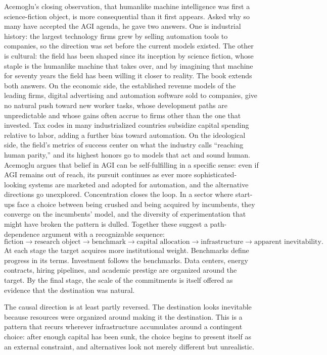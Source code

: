 \documentclass[11pt]{article}
\begin{document}
Acemoglu's closing observation, that humanlike machine intelligence was first a science-fiction object, is more consequential than it first appears. Asked why so many have accepted the AGI agenda, he gave two answers. One is industrial history: the largest technology firms grew by selling automation tools to companies, so the direction was set before the current models existed. The other is cultural: the field has been shaped since its inception by science fiction, whose staple is the humanlike machine that takes over, and by imagining that machine for seventy years the field has been willing it closer to reality. The book extends both answers. On the economic side, the established revenue models of the leading firms, digital advertising and automation software sold to companies, give no natural push toward new worker tasks, whose development paths are unpredictable and whose gains often accrue to firms other than the one that invested. Tax codes in many industrialized countries subsidize capital spending relative to labor, adding a further bias toward automation. On the ideological side, the field's metrics of success center on what the industry calls ``reaching human parity,'' and its highest honors go to models that act and sound human. Acemoglu argues that belief in AGI can be self-fulfilling in a specific sense: even if AGI remains out of reach, its pursuit continues as ever more sophisticated-looking systems are marketed and adopted for automation, and the alternative directions go unexplored. Concentration closes the loop. In a sector where start-ups face a choice between being crushed and being acquired by incumbents, they converge on the incumbents' model, and the diversity of experimentation that might have broken the pattern is dulled. Together these suggest a path-dependence argument with a recognizable sequence:
\[
\text{fiction}
\to \text{research object}
\to \text{benchmark}
\to \text{capital allocation}
\to \text{infrastructure}
\to \text{apparent inevitability}.
\]
At each stage the target acquires more institutional weight. Benchmarks define progress in its terms. Investment follows the benchmarks. Data centers, energy contracts, hiring pipelines, and academic prestige are organized around the target. By the final stage, the scale of the commitments is itself offered as evidence that the destination was natural.

The causal direction is at least partly reversed. The destination looks inevitable because resources were organized around making it the destination. This is a pattern that recurs wherever infrastructure accumulates around a contingent choice: after enough capital has been sunk, the choice begins to present itself as an external constraint, and alternatives look not merely different but unrealistic.
\end{document}
